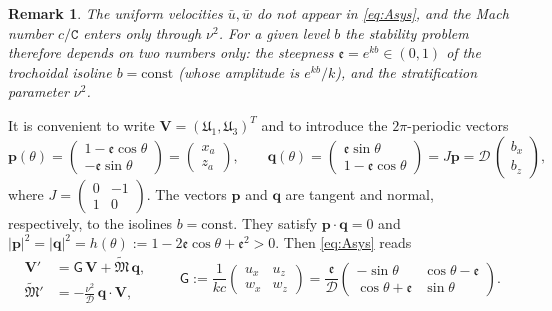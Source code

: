 \documentclass[reqno]{amsart}
\newcommand{\cs}{\texttt{C}}
\newcommand{\Msf}{\mathsf{G}}
\newcommand{\B}{{\mathfrak{M}}}
\newcommand{\D}{\mathcal{D}}
\newcommand{\ee}{\mathfrak{e}}
\newtheorem{remark}[theorem]{Remark}
\begin{document}
\begin{remark}\label{rem:params}
The uniform velocities $\bar{u},\bar{w}$ do not appear in \eqref{eq:Asys}, and the Mach number $c/\cs$ enters only through $\nu^2$. For a given level $b$ the stability problem therefore depends on two numbers only: the steepness $\ee=e^{kb}\in(0,1)$ of the trochoidal isoline $b=\mathrm{const}$ (whose amplitude is $e^{kb}/k$), and the stratification parameter $\nu^2$.
\end{remark}
\noindent
It is convenient to write $\mathbf V=(\mathfrak{U}_1,\mathfrak{U}_3)^T$ and to introduce the $2\pi$-periodic vectors
\begin{equation}\label{eq:pq}
\mathbf p(\theta)=\begin{pmatrix}1-\ee\cos\theta\\-\ee\sin\theta\end{pmatrix}=\begin{pmatrix}
    x_a\\ z_a
\end{pmatrix},\qquad
\mathbf q(\theta)=\begin{pmatrix}\ee\sin\theta\\1-\ee\cos\theta\end{pmatrix}=J\mathbf p=\D\,\begin{pmatrix}
    b_x\\ b_z
\end{pmatrix},
\end{equation}
where $\displaystyle J=\begin{pmatrix}0&-1\\1&0\end{pmatrix}$. The vectors $\mathbf p$ and $\mathbf q$ are tangent and normal, respectively, to the isolines $b=\mathrm{const}$. They satisfy $\mathbf p\cdot\mathbf q=0$ and $|\mathbf p|^2=|\mathbf q|^2=h(\theta):=1-2\ee\cos\theta+\ee^2>0$. Then \eqref{eq:Asys} reads
\begin{equation}\label{eq:compact}
\begin{aligned}
    \mathbf V'&=\Msf\,\mathbf V+\widetilde{\B}\,\mathbf q,\\
\widetilde{\B}'&=-\frac{\nu^2}{\D}\,\mathbf q\cdot\mathbf V,
\end{aligned}\qquad
\Msf:=\frac{1}{kc}\begin{pmatrix}u_x&u_z\\w_x&w_z\end{pmatrix}
=\frac{\ee}{\D}\begin{pmatrix}-\sin\theta&\cos\theta-\ee\\ \cos\theta+\ee&\sin\theta\end{pmatrix}.
\end{equation}
\end{document}
